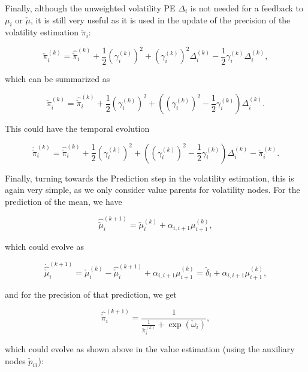 Finally, although the unweighted volatility PE $\Delta_i$ is not needed for a feedback to $\mu_i$ or $\check{\mu}$, it is still very useful as it is used in the update of the precision of the volatility estimation $\check{\pi}_i$:

\begin{equation}
	\check{\pi}_i^{(k)} = \hat{\check{\pi}}_i^{(k)} + \frac{1}{2} (\gamma_i^{(k)})^2 + (\gamma_i^{(k)})^2 \Delta_i^{(k)} - \frac{1}{2} \gamma_i^{(k)} \Delta_i^{(k)}, 
\end{equation}

which can be summarized as 

\begin{equation}
	\check{\pi}_i^{(k)} = \hat{\check{\pi}}_i^{(k)} + \frac{1}{2} (\gamma_i^{(k)})^2 + ((\gamma_i^{(k)})^2 - \frac{1}{2} \gamma_i^{(k)}) \Delta_i^{(k)}.
\end{equation}

This could have the temporal evolution

\begin{equation}
	\dot{\check{\pi}}_i^{(k)} = \hat{\check{\pi}}_i^{(k)} + \frac{1}{2} (\gamma_i^{(k)})^2 + ((\gamma_i^{(k)})^2 - \frac{1}{2} \gamma_i^{(k)}) \Delta_i^{(k)} - \check{\pi}_i^{(k)}.
\end{equation}

Finally, turning towards the \textsf{Prediction} step in the volatility estimation, this is again very simple, as we only consider value parents for volatility nodes. For the prediction of the mean, we have

\begin{equation}
	\hat{\check{\mu}}_i^{(k+1)} = \check{\mu}_i^{(k)} + \alpha_{i,i+1} \mu_{i+1}^{(k)}, 
\end{equation}

which could evolve as 

\begin{equation}
	\dot{\hat{\check{\mu}}}_i^{(k+1)} = \check{\mu}_i^{(k)} - \hat{\check{\mu}}_i^{(k+1)} + \alpha_{i,i+1} \mu_{i+1}^{(k)} = \check{\delta}_i + \alpha_{i,i+1} \mu_{i+1}^{(k)}, 
\end{equation}

and for the precision of that prediction, we get

\begin{equation}
  \hat{\check{\pi}}_i^{(k+1)} = \frac{1}{\frac{1}{\check{\pi}_i^{(k)}} + \exp(\check{\omega}_i)}, 
\end{equation}

which could evolve as shown above in the value estimation (using the auxiliary nodes $\check{p}_{i1}$):

